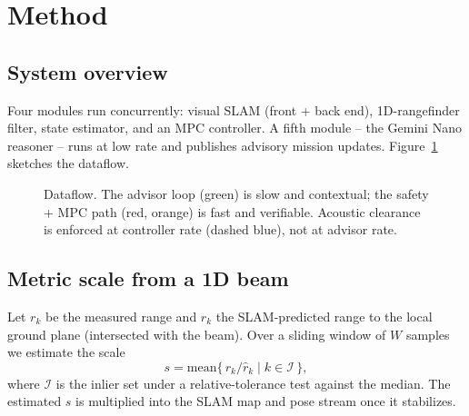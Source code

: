 \section{Method}
\label{sec:method}

\subsection{System overview}
Four modules run concurrently: visual SLAM (front + back end),
1D-rangefinder filter, state estimator, and an MPC controller.
A fifth module -- the Gemini Nano reasoner -- runs at low rate and
publishes advisory mission updates. Figure~\ref{fig:sysdiag}
sketches the dataflow.

\begin{figure}[t]
\centering
\caption{Dataflow. The advisor loop (green) is slow and contextual;
the safety + MPC path (red, orange) is fast and verifiable. Acoustic
clearance is enforced at controller rate (dashed blue), not at
advisor rate.}
\label{fig:sysdiag}
\end{figure}

\subsection{Metric scale from a 1D beam}
Let $r_k$ be the measured range and $\hat r_k$ the SLAM-predicted range
to the local ground plane (intersected with the beam). Over a sliding
window of $W$ samples we estimate the scale
\[
  s = \mathrm{mean}\bigl\{\, r_k / \hat r_k \mid k \in \mathcal{I} \,\bigr\},
\]
where $\mathcal{I}$ is the inlier set under a relative-tolerance test
against the median. The estimated $s$ is multiplied into the SLAM map
and pose stream once it stabilizes.

